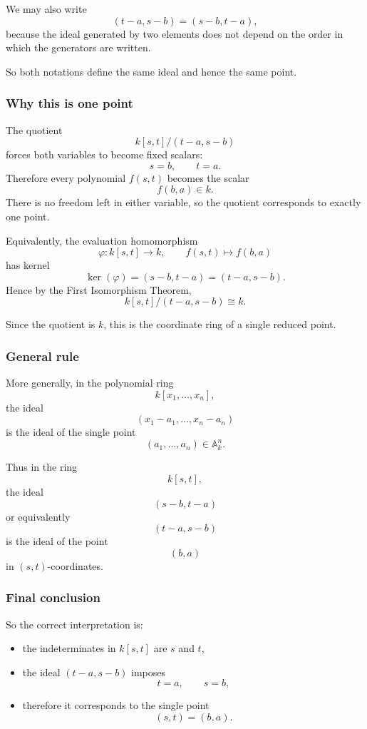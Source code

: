 \documentclass[12pt,a4paper]{article}
\theoremstyle{notespace}
\theoremstyle{definition}
\begin{document}
We may also write
\[
(t-a,s-b)=(s-b,t-a),
\]
because the ideal generated by two elements does not depend on the order in which the generators are written.

So both notations define the same ideal and hence the same point.

\subsubsection{Why this is one point}

The quotient
\[
k[s,t]/(t-a,s-b)
\]
forces both variables to become fixed scalars:
\[
s=b,\qquad t=a.
\]
Therefore every polynomial \(f(s,t)\) becomes the scalar
\[
f(b,a)\in k.
\]
There is no freedom left in either variable, so the quotient corresponds to exactly one point.

Equivalently, the evaluation homomorphism
\[
\varphi:k[s,t]\longrightarrow k,
\qquad
f(s,t)\longmapsto f(b,a)
\]
has kernel
\[
\ker(\varphi)=(s-b,t-a)=(t-a,s-b).
\]
Hence by the First Isomorphism Theorem,
\[
k[s,t]/(t-a,s-b)\cong k.
\]

Since the quotient is \(k\), this is the coordinate ring of a single reduced point.

\subsubsection{General rule}

More generally, in the polynomial ring
\[
k[x_1,\dots,x_n],
\]
the ideal
\[
(x_1-a_1,\dots,x_n-a_n)
\]
is the ideal of the single point
\[
(a_1,\dots,a_n)\in \mathbb{A}^n_k.
\]

Thus in the ring
\[
k[s,t],
\]
the ideal
\[
(s-b,t-a)
\]
or equivalently
\[
(t-a,s-b)
\]
is the ideal of the point
\[
(b,a)
\]
in \((s,t)\)-coordinates.

\subsubsection{Final conclusion}

So the correct interpretation is:

\begin{itemize}
	\item the indeterminates in \(k[s,t]\) are \(s\) and \(t\),
	\item the ideal \((t-a,s-b)\) imposes
	\[
	t=a,\qquad s=b,
	\]
	\item therefore it corresponds to the single point
	\[
	(s,t)=(b,a).
	\]
\end{itemize}
\end{document}
